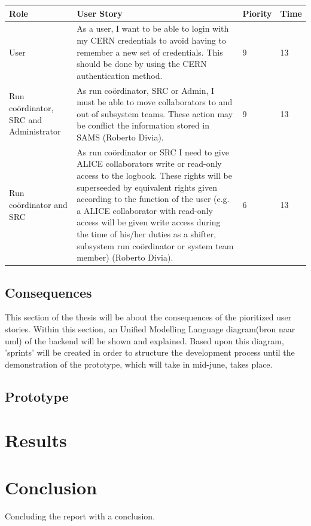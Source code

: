 \documentclass[paper=a4, fontsize=11pt,twoside]{scrartcl}	%
\begin{document}
\begin{longtable}{ | p{2cm} | p{8cm} | p{1.5cm} | l |}
\hline
Role & User Story & Piority & Time \\ \hline
User & As a user, I want to be able to login with my CERN credentials to avoid having to remember a new set of credentials. This should be done by using the CERN authentication method. & 9 & 13 \\ \hline
Run coördinator, SRC and Administrator &  As run coördinator, SRC or Admin, I must be able to move collaborators to and out of subsystem teams. These action may be conflict the information stored in SAMS (Roberto Divia). & 9 & 13 \\ \hline
Run coördinator and SRC &  As run coördinator or SRC I need to give ALICE collaborators write or read-only access to the logbook. These rights will be superseeded by equivalent rights given according to the function of the user (e.g. a ALICE collaborator with read-only access will be given write access during the time of his/her duties as a shifter, subsystem run coördinator or system team member) (Roberto Divia).&6&13 \\ \hline

\end{longtable}



\newpage
\subsection{Consequences}
This section of the thesis will be about the consequences of the pioritized user stories. Within this section, an Unified Modelling Language diagram(bron naar uml) of the backend will be shown and explained. Based upon this diagram, 'sprints' will be created in order to structure the development process until the demonstration of the prototype, which will take in mid-june, takes place. \\



\subsection{Prototype}

\newpage
\section{Results}


\newpage
\section{Conclusion}
Concluding the report with a conclusion.
\newpage
\end{document}
